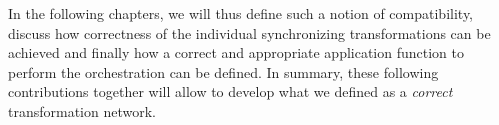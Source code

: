 In the following chapters, we will thus define such a notion of compatibility, discuss how correctness of the individual synchronizing transformations can be achieved and finally how a correct and appropriate application function to perform the orchestration can be defined.
In summary, these following contributions together will allow to develop what we defined as a \emph{correct} transformation network.








